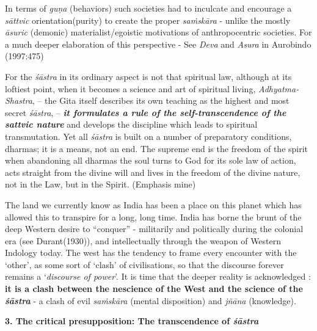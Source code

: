 In terms of {\sl guṇa} (behaviors) such societies had to inculcate and encourage a {\sl sāttvic} orientation(purity) to create the proper {\sl saṁskāra} - unlike the mostly {\sl āsuric} (demonic) materialist/egoistic motivations of anthropocentric societies. For a much deeper elaboration of this perspective - See {\sl Deva} and {\sl Asura} in Aurobindo (1997:475)
\begin{myquote}
For the {\sl śāstra} in its ordinary aspect is not that spiritual law, although at its loftiest point, when it becomes a science and art of spiritual living, {\sl Adhyatma-Shastra}, -- the Gita itself describes its own teaching as the highest and most secret {\sl śāstra}, -- {{\sl\bfseries it formulates a rule of the self-transcendence of the sattvic nature}\relax} and develops the discipline which leads to spiritual transmutation. Yet all {\sl śāstra} is built on a number of preparatory conditions, dharmas; it is a means, not an end. The supreme end is the freedom of the spirit when abandoning all dharmas the soul turns to God for its sole law of action, acts straight from the divine will and lives in the freedom of the divine nature, not in the Law, but in the Spirit. (Emphasis mine)
\end{myquote}

The land we currently know as India has been a place on this planet which has allowed this to transpire for a long, long time. India has borne the brunt of the deep Western desire to ``conquer'' - militarily and politically during the colonial era (see Durant(1930)), and intellectually through the weapon of Western Indology today. The west has the tendency to frame every encounter with the `other', as some sort of `clash' of civilisations, so that the discourse forever remains a `{\sl discourse of power}'. It is time that the deeper reality is acknowledged : {\bf it is a clash between the nescience of the West and the science of the} {{\sl\bfseries śāstra}\relax} - a clash of evil {\sl saṁskāra} (mental disposition) and {\sl jñāna} (knowledge).


{\bf 3. The critical presupposition: The transcendence of {{\sl\bfseries śāstra}\relax}}


